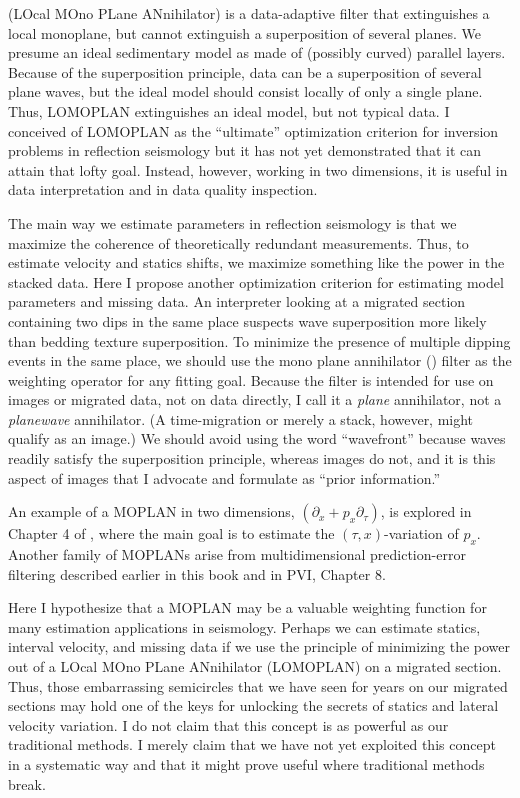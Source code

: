  (LOcal MOno PLane ANnihilator)
is a data-adaptive filter that extinguishes a local monoplane,
but cannot extinguish a superposition of several planes.
We presume an ideal sedimentary model
as made of (possibly curved) parallel layers.
Because of the superposition principle,
data can be a superposition of several plane waves,
but the ideal model should consist locally of only a single plane.
Thus, LOMOPLAN extinguishes an ideal model, but not typical data.
I conceived of LOMOPLAN as the ``ultimate'' optimization criterion
for inversion problems in reflection seismology
\cite[]{Claerbout.sep.73.409}
but it has not yet demonstrated that it can attain that lofty goal.
Instead,
however, working in two dimensions,
it is useful in data interpretation
and in data quality inspection.

\par
The main way we estimate parameters in reflection seismology
is that we maximize the coherence of theoretically redundant measurements.
Thus, to estimate velocity and statics shifts,
we maximize something like the power in the stacked data.
Here I propose another optimization criterion
for estimating model parameters and missing data.
An interpreter looking at a migrated section containing
two dips in the same place
suspects wave superposition more likely than bedding texture superposition.
To minimize the presence of multiple dipping events in the same place,
we should use the mono plane annihilator () filter
as the weighting operator for any fitting goal.
Because the filter is intended for use on images or migrated data,
not on data directly,
I call it a {\it plane} annihilator, not a {\it planewave} annihilator.
(A time-migration or merely a stack, however, might qualify as an image.)
We should avoid using the word ``wavefront''
because waves readily satisfy the superposition principle,
whereas images do not,
and it is this aspect of images that I advocate and formulate
as ``prior information.''

\par
An example of a MOPLAN in two dimensions,
$(\partial_x + p_x \partial_\tau)$,
is explored in Chapter 4 of ,
where the main goal is to estimate the
$(\tau ,x)$-variation of $p_x$.
Another family of MOPLANs arise from multidimensional
prediction-error filtering
described earlier in this book and
in PVI, Chapter 8.

\par
Here I hypothesize that a MOPLAN may be a valuable weighting function
for many estimation applications in seismology.
Perhaps we can estimate statics, interval velocity, and missing data
if we use the principle of minimizing the power out
of a LOcal MOno PLane ANnihilator (LOMOPLAN) on a migrated section.
Thus, those embarrassing semicircles that we have seen for years
on our migrated sections may hold one of the keys
for unlocking the secrets of statics and lateral velocity variation.
I do not claim that this concept is as powerful as our traditional methods.
I merely claim that we have not yet exploited this concept in a systematic way
and that it might prove useful where traditional methods break.


